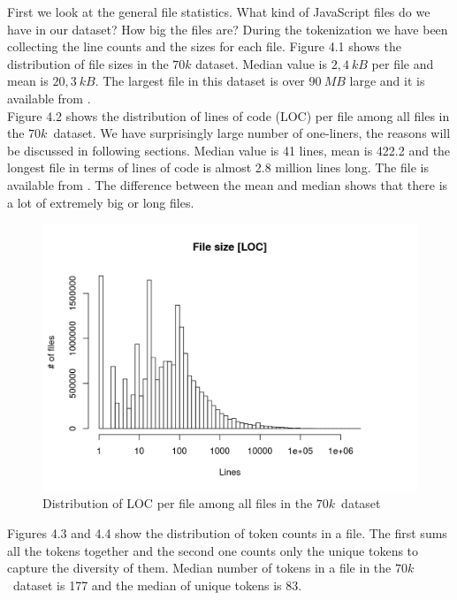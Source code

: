 \documentclass[thesis=M,english]{FITthesis}[2012/10/20]
\begin{document}
First we look at the general file statistics. What kind of JavaScript files do we have in our dataset? How big the files are? During the tokenization we have been collecting the line counts and the sizes for each file. Figure 4.1 shows the distribution of file sizes in the $70k$ dataset. Median value is $2,4~kB$ per file and mean is $20,3~kB$. The largest file in this dataset is over $90~MB$ large and it is available from \cite{largest}. \\

Figure 4.2 shows the distribution of lines of code (LOC) per file among all files in the $70k$ dataset. We have surprisingly large number of one-liners, the reasons will be discussed in following sections. Median value is 41 lines, mean is 422.2 and the longest file in terms of lines of code is almost 2.8 million lines long. The file is available from \cite{longest}. The difference between the mean and median shows that there is a lot of extremely big or long files. \\

\begin{center}
\begin{figure}[h!]
	\includegraphics[trim=0cm 0cm 2cm 0cm, totalheight=230pt]{images/70k_locs.png}
	\caption{Distribution of LOC per file among all files in the $70k$ dataset}
	\label{fig: 70k_locs}
\end{figure}
\end{center}


Figures 4.3 and 4.4 show the distribution of token counts in a file. The first sums all the tokens together and the second one counts only the unique tokens to capture the diversity of them. Median number of tokens in a file in the $70k$ dataset is 177 and the median of unique tokens is 83. \\
\end{document}
